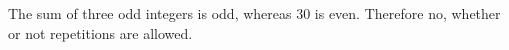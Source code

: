 The sum of three odd integers is odd, whereas 30 is even. Therefore $\boxed{\text{no}}$, whether or not repetitions are allowed.
